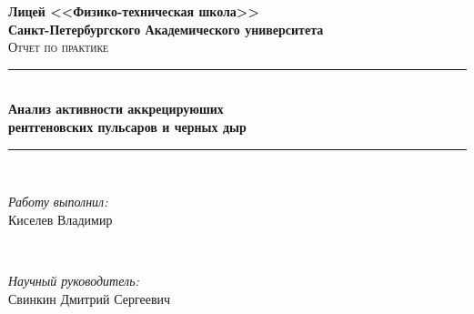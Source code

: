 \begin{titlepage}

\newcommand{\HRule}{\rule{\linewidth}{0.5mm}} %

\center %
 

\textbf{\large Лицей <<Физико-техническая школа>>}\\[0.3cm] %
\textbf{\large Санкт-Петербургского Академического университета}\\[3cm]

\textsc{\Large Отчет по практике} 


\HRule \\
{ \huge \bfseries Анализ активности аккрецируюших\\  рентгеновских пульсаров и черных дыр}\\[0.03cm] %
\HRule \\[1.5cm]

 

\begin{minipage}{0.4\textwidth}
\begin{flushleft} \large
\emph{Работу выполнил:}\\
Киселев Владимир%
\end{flushleft}
\end{minipage}
~
\begin{minipage}{0.4\textwidth}
\begin{flushright} \large
\emph{Научный руководитель:} \\
Свинкин Дмитрий Сергеевич %
\end{flushright}
\end{minipage}\\[1cm]



\end{titlepage}
